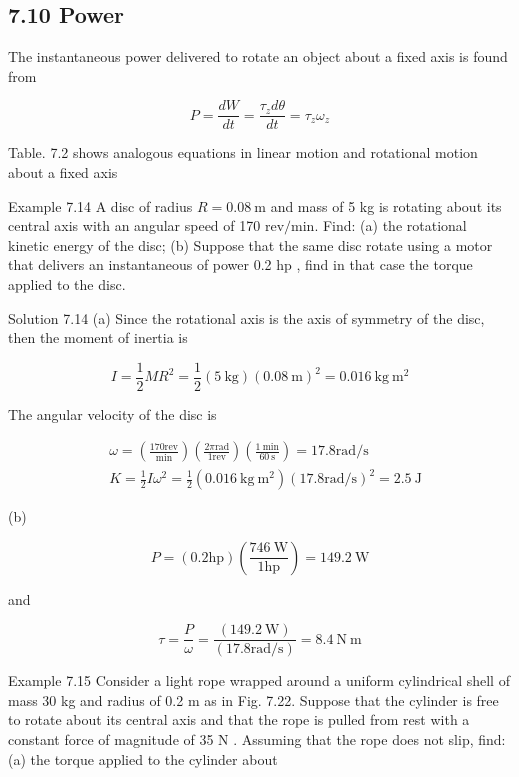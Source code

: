\documentclass[10pt]{article}
\begin{document}
\subsection*{7.10 Power}
The instantaneous power delivered to rotate an object about a fixed axis is found from

$$
P=\frac{d W}{d t}=\frac{\tau_{z} d \theta}{d t}=\tau_{z} \omega_{z}
$$

Table. 7.2 shows analogous equations in linear motion and rotational motion about a fixed axis

Example 7.14 A disc of radius $R=0.08 \mathrm{~m}$ and mass of 5 kg is rotating about its central axis with an angular speed of 170 $\mathrm{rev} / \mathrm{min}$. Find: (a) the rotational kinetic energy of the disc; (b) Suppose that the same disc rotate using a motor that delivers an instantaneous of power 0.2 hp , find in that case the torque applied to the disc.

Solution 7.14 (a) Since the rotational axis is the axis of symmetry of the disc, then the moment of inertia is

$$
I=\frac{1}{2} M R^{2}=\frac{1}{2}(5 \mathrm{~kg})(0.08 \mathrm{~m})^{2}=0.016 \mathrm{~kg} \mathrm{~m}^{2}
$$

The angular velocity of the disc is

$$
\begin{aligned}
& \omega=\left(\frac{170 \mathrm{rev}}{\mathrm{min}}\right)\left(\frac{2 \pi \mathrm{rad}}{1 \mathrm{rev}}\right)\left(\frac{1 \mathrm{~min}}{60 \mathrm{~s}}\right)=17.8 \mathrm{rad} / \mathrm{s} \\
& K=\frac{1}{2} I \omega^{2}=\frac{1}{2}\left(0.016 \mathrm{~kg} \mathrm{~m}^{2}\right)(17.8 \mathrm{rad} / \mathrm{s})^{2}=2.5 \mathrm{~J}
\end{aligned}
$$

(b)

$$
P=(0.2 \mathrm{hp})\left(\frac{746 \mathrm{~W}}{1 \mathrm{hp}}\right)=149.2 \mathrm{~W}
$$

and

$$
\tau=\frac{P}{\omega}=\frac{(149.2 \mathrm{~W})}{(17.8 \mathrm{rad} / \mathrm{s})}=8.4 \mathrm{~N} \mathrm{~m}
$$

Example 7.15 Consider a light rope wrapped around a uniform cylindrical shell of mass 30 kg and radius of 0.2 m as in Fig. 7.22. Suppose that the cylinder is free to rotate about its central axis and that the rope is pulled from rest with a constant force of magnitude of 35 N . Assuming that the rope does not slip, find: (a) the torque applied to the cylinder about
\end{document}
